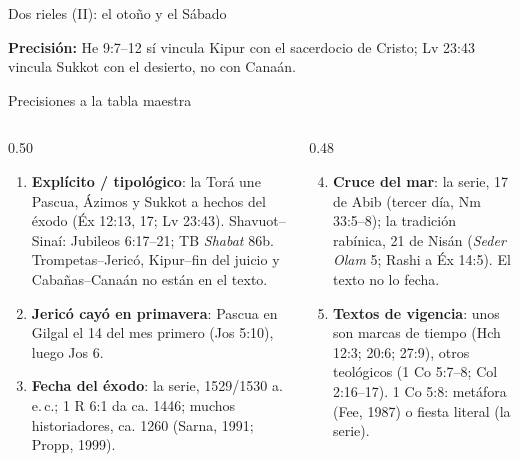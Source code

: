 \documentclass[hyperref={bookmarks=false},aspectratio=169]{beamer}
\newcommand{\destacar}[1]{\textbf{\textcolor{tierraroja}{#1}}}
\newcommand{\precision}[1]{{\footnotesize\color{sepia}\textbf{Precisión:} #1}}
\begin{document}
\begin{frame}{Dos rieles (II): el otoño y el Sábado}
\centering
{}\par
{\scriptsize\precision{He 9:7--12 sí vincula Kipur con el sacerdocio de Cristo; Lv 23:43 vincula Sukkot con el desierto, no con Canaán.}}
\end{frame}

\begin{frame}{Precisiones a la tabla maestra}
\begin{columns}[t,onlytextwidth]
\begin{column}{0.50\textwidth}\scriptsize
\begin{enumerate}
\item \destacar{Explícito / tipológico}: la Torá une Pascua, Ázimos y Sukkot a hechos del éxodo (Éx 12:13, 17; Lv 23:43). Shavuot--Sinaí: Jubileos 6:17--21; TB \emph{Shabat} 86b. Trompetas--Jericó, Kipur--fin del juicio y Cabañas--Canaán no están en el texto.
\item \destacar{Jericó cayó en primavera}: Pascua en Gilgal el 14 del mes primero (Jos 5:10), luego Jos 6.
\item \destacar{Fecha del éxodo}: la serie, 1529/1530 a.\,e.\,c.; 1 R 6:1 da ca. 1446; muchos historiadores, ca. 1260 (Sarna, 1991; Propp, 1999).
\end{enumerate}
\end{column}
\begin{column}{0.48\textwidth}\scriptsize
\begin{enumerate}\setcounter{enumi}{3}
\item \destacar{Cruce del mar}: la serie, 17 de Abib (tercer día, Nm 33:5--8); la tradición rabínica, 21 de Nisán (\emph{Seder Olam} 5; Rashi a Éx 14:5). El texto no lo fecha.
\item \destacar{Textos de vigencia}: unos son marcas de tiempo (Hch 12:3; 20:6; 27:9), otros teológicos (1 Co 5:7--8; Col 2:16--17). 1 Co 5:8: metáfora (Fee, 1987) o fiesta literal (la serie).
\end{enumerate}
\end{column}
\end{columns}
\end{frame}
\end{document}
